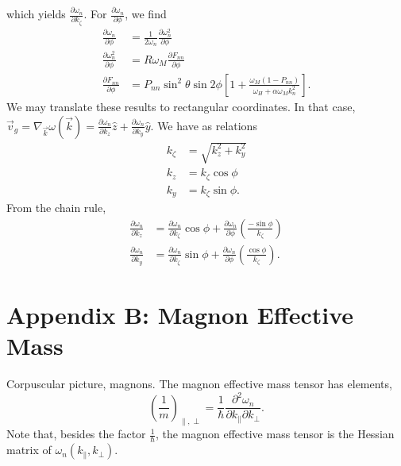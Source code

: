 \documentclass{article}
\begin{document}
which yields $\frac{\partial \omega_{n}}{\partial k_{\zeta}}$. For $\frac{\partial \omega_{n}}{\partial \phi}$, we find
\begin{align}
\frac{\partial \omega_{n}}{\partial \phi} &= \frac{1}{2 \omega_{n}} \frac{\partial \omega_{n}^2}{\partial \phi} \\
\frac{\partial \omega_{n}^2}{\partial \phi} &= R \omega_{M} \frac{\partial F_{nn}}{\partial \phi} \\
\frac{\partial F_{nn}}{\partial \phi} &= P_{nn} \sin^2{\theta} \sin{2\phi} \left[ 1 + \frac{\omega_{M} (1 - P_{nn})}{\omega_{H} + \alpha \omega_{M} k_{n}^2} \right].
\end{align}
We may translate these results to rectangular coordinates. In that case, $\vec{v}_{g} = \nabla_{\vec{k}} \omega (\vec{k}) = \frac{\partial \omega_{n}}{\partial k_{z}} \hat{z} + \frac{\partial \omega_{n}}{\partial k_{y}} \hat{y}$. We have as relations
\begin{align}
k_{\zeta} &= \sqrt{k_{z}^2 + k_{y}^2} \\
k_{z} &= k_{\zeta} \cos{\phi} \\
k_{y} &= k_{\zeta} \sin{\phi}.
\end{align}
From the chain rule,
\begin{align}
\frac{\partial \omega_{n}}{\partial k_{z}} &= \frac{\partial \omega_{n}}{\partial k_{\zeta}} \cos{\phi} + \frac{\partial \omega_{n}}{\partial \phi} \left(\frac{-\sin{\phi}}{k_{\zeta}}\right) \\
\frac{\partial \omega_{n}}{\partial k_{y}} &= \frac{\partial \omega_{n}}{\partial k_{\zeta}} \sin{\phi} + \frac{\partial \omega_{n}}{\partial \phi} \left(\frac{\cos{\phi}}{k_{\zeta}}\right).
\end{align}

\section{Appendix B: Magnon Effective Mass}
Corpuscular picture, magnons. The magnon effective mass tensor has elements,
\begin{equation}
\left(\frac{1}{m}\right)_{\parallel , \perp} = \frac{1}{\hbar} \frac{\partial^2 \omega_{n}}{\partial k_{\parallel} \partial k_{\perp}}.
\end{equation}
Note that, besides the factor $\frac{1}{\hbar}$, the magnon effective mass tensor is the Hessian matrix of $\omega_{n} ( k_{\parallel} , k_{\perp} )$.
\end{document}
